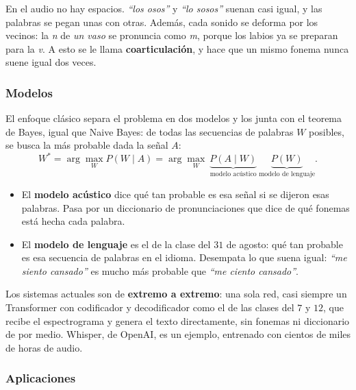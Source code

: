\documentclass[11pt,letterpaper]{article}
\begin{document}
\begin{ojo}
    En el audio no hay espacios. \textit{``los osos''} y \textit{``lo
    sosos''} suenan casi igual, y las palabras se pegan unas con otras.
    Además, cada sonido se deforma por los vecinos: la \textit{n} de
    \textit{un vaso} se pronuncia como \textit{m}, porque los labios ya
    se preparan para la \textit{v}. A esto se le llama
    \textbf{coarticulación}, y hace que un mismo fonema nunca suene
    igual dos veces.
\end{ojo}

\subsubsection*{Modelos}

El enfoque clásico separa el problema en dos modelos y los junta con
el teorema de Bayes, igual que Naive Bayes: de todas las secuencias de
palabras $W$ posibles, se busca la más probable dada la señal $A$:
\[
    W^{*} = \arg\max_{W} P(W \mid A)
          = \arg\max_{W}\
            \underbrace{P(A \mid W)}_{\text{modelo acústico}}\
            \underbrace{P(W)}_{\text{modelo de lenguaje}} .
\]

\begin{itemize}[itemsep=0.3em]
    \item El \textbf{modelo acústico} dice qué tan probable es esa
          señal si se dijeron esas palabras. Pasa por un diccionario
          de pronunciaciones que dice de qué fonemas está hecha cada
          palabra.
    \item El \textbf{modelo de lenguaje} es el de la clase del $31$ de
          agosto: qué tan probable es esa secuencia de palabras en el
          idioma. Desempata lo que suena igual:
          \textit{``me siento cansado''} es mucho más probable que
          \textit{``me ciento cansado''}.
\end{itemize}

Los sistemas actuales son de \textbf{extremo a extremo}: una sola red,
casi siempre un Transformer con codificador y decodificador como el
de las clases del $7$ y $12$, que recibe el espectrograma y genera el
texto directamente, sin fonemas ni diccionario de por medio. Whisper,
de OpenAI, es un ejemplo, entrenado con cientos de miles de horas de
audio.

\subsubsection*{Aplicaciones}
\end{document}
